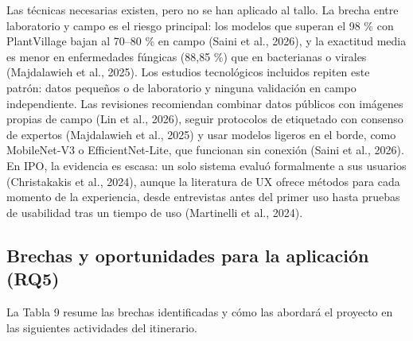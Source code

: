 \documentclass[11pt]{article}
\newcommand{\sangria}{\hspace*{1.27cm}}
\begin{document}
\sangria Las técnicas necesarias existen, pero no se han aplicado al tallo. La brecha entre laboratorio y campo es el riesgo principal: los modelos que superan el 98 \% con PlantVillage bajan al 70–80 \% en campo (Saini et al., 2026), y la exactitud media es menor en enfermedades fúngicas (88,85 \%) que en bacterianas o virales (Majdalawieh et al., 2025). Los estudios tecnológicos incluidos repiten este patrón: datos pequeños o de laboratorio y ninguna validación en campo independiente. Las revisiones recomiendan combinar datos públicos con imágenes propias de campo (Lin et al., 2026), seguir protocolos de etiquetado con consenso de expertos (Majdalawieh et al., 2025) y usar modelos ligeros en el borde, como MobileNet-V3 o EfficientNet-Lite, que funcionan sin conexión (Saini et al., 2026). En IPO, la evidencia es escasa: un solo sistema evaluó formalmente a sus usuarios (Christakakis et al., 2024), aunque la literatura de UX ofrece métodos para cada momento de la experiencia, desde entrevistas antes del primer uso hasta pruebas de usabilidad tras un tiempo de uso (Martinelli et al., 2024).

\subsection{Brechas y oportunidades para la aplicación (RQ5)}

La Tabla 9 resume las brechas identificadas y cómo las abordará el proyecto en las siguientes actividades del itinerario.
\end{document}
